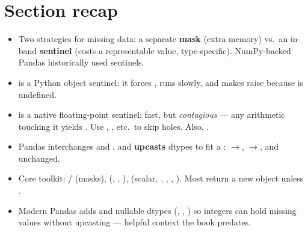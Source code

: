 \documentclass[11pt]{article}
\begin{document}
\section*{Section recap}
\begin{itemize}
  \item Two strategies for missing data: a separate \textbf{mask} (extra memory) vs.\ an in-band \textbf{sentinel} (costs a representable value, type-specific). NumPy-backed Pandas historically used sentinels.
  \item {} is a Python object sentinel: it forces , runs slowly, and makes  raise  because  is undefined.
  \item {} is a native floating-point sentinel: fast, but \emph{contagious} --- any arithmetic touching it yields . Use , , etc.\ to skip holes. Also, .
  \item Pandas interchanges  and , and \textbf{upcasts} dtypes to fit a : $\to$, $\to$,  and  unchanged.
  \item Core toolkit: / (masks),  (, , ),  (scalar, , , , ). Most return a new object unless .
  \item Modern Pandas adds  and nullable dtypes (, , ) so integers can hold missing values without upcasting --- helpful context the book predates.
\end{itemize}
\end{document}
